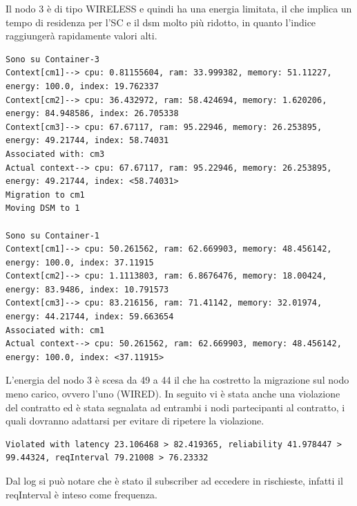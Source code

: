Il nodo 3 è di tipo WIRELESS e quindi ha una energia limitata, il che implica un tempo di residenza per l'SC e il dsm molto più ridotto, in quanto l'indice raggiungerà rapidamente valori alti.
\begin{lstlisting}
Sono su Container-3
Context[cm1]--> cpu: 0.81155604, ram: 33.999382, memory: 51.11227, energy: 100.0, index: 19.762337
Context[cm2]--> cpu: 36.432972, ram: 58.424694, memory: 1.620206, energy: 84.948586, index: 26.705338
Context[cm3]--> cpu: 67.67117, ram: 95.22946, memory: 26.253895, energy: 49.21744, index: 58.74031
Associated with: cm3
Actual context--> cpu: 67.67117, ram: 95.22946, memory: 26.253895, energy: 49.21744, index: <58.74031>
Migration to cm1
Moving DSM to 1

Sono su Container-1
Context[cm1]--> cpu: 50.261562, ram: 62.669903, memory: 48.456142, energy: 100.0, index: 37.11915
Context[cm2]--> cpu: 1.1113803, ram: 6.8676476, memory: 18.00424, energy: 83.9486, index: 10.791573
Context[cm3]--> cpu: 83.216156, ram: 71.41142, memory: 32.01974, energy: 44.21744, index: 59.663654
Associated with: cm1
Actual context--> cpu: 50.261562, ram: 62.669903, memory: 48.456142, energy: 100.0, index: <37.11915>
\end{lstlisting}
L'energia del nodo 3 è scesa da 49 a 44 il che ha costretto la migrazione sul nodo meno carico, ovvero l'uno (WIRED). In seguito vi è stata anche una violazione del contratto ed è stata segnalata ad entrambi i nodi partecipanti al contratto, i quali dovranno adattarsi per evitare di ripetere la violazione.
\begin{lstlisting}
Violated with latency 23.106468 > 82.419365, reliability 41.978447 > 99.44324, reqInterval 79.21008 > 76.23332
\end{lstlisting}
Dal log si può notare che è stato il subscriber ad eccedere in rischieste, infatti il reqInterval è inteso come frequenza.

